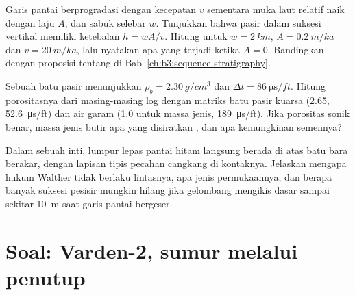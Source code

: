 \begin{exercise}[$\star\star\star$]\label{exo:b3:facies-models:10}
Garis pantai berprogradasi dengan kecepatan $v$ sementara muka laut relatif naik dengan laju
$A$, dan sabuk  selebar $w$. Tunjukkan bahwa pasir  dalam
suksesi vertikal memiliki ketebalan $h = wA/v$. Hitung untuk $w = \qty{2}{km}$,
$A = \qty{0.2}{m/ka}$ dan $v = \qty{20}{m/ka}$, lalu nyatakan apa yang terjadi ketika
$A = 0$. Bandingkan dengan proposisi tentang  di
Bab~\ref{ch:b3:sequence-stratigraphy}.
\end{exercise}

\begin{exercise}[$\star\star\star$]\label{exo:b3:facies-models:11}
Sebuah batu pasir menunjukkan $\rho_b = \qty{2.30}{g/cm^3}$ dan $\Delta t =
\qty{86}{\micro\second/ft}$. Hitung porositasnya dari masing-masing log dengan matriks
batu pasir kuarsa (2.65, \qty{52.6}{\micro\second/ft}) dan air garam (1.0 untuk
massa jenis, \qty{189}{\micro\second/ft}). Jika porositas sonik benar, massa jenis butir
apa yang disiratkan , dan apa kemungkinan semennya?
\end{exercise}

\begin{exercise}[$\star\star\star$]\label{exo:b3:facies-models:12}
Dalam sebuah inti, lumpur lepas pantai hitam langsung berada di atas batu bara berakar, dengan
lapisan tipis pecahan cangkang di kontaknya. Jelaskan mengapa hukum Walther tidak
berlaku lintasnya, apa jenis permukaannya, dan berapa banyak suksesi pesisir
mungkin hilang jika gelombang mengikis dasar sampai 
sekitar \qty{10}{m} saat garis pantai bergeser.
\end{exercise}

\section{Soal: Varden-2, sumur melalui penutup}

